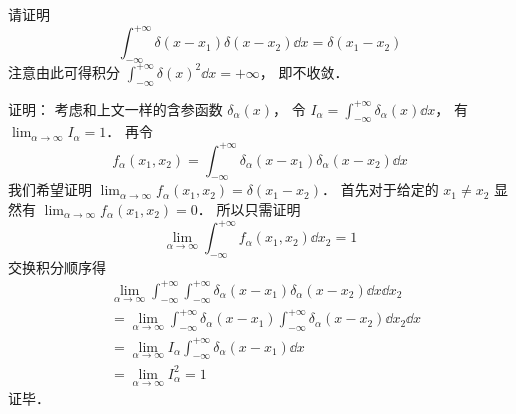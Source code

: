 \begin{example}{}
请证明
\begin{equation}
\int_{-\infty}^{+\infty} \delta(x-x_1) \delta(x-x_2) \dd{x} = \delta(x_1 - x_2)
\end{equation}
注意由此可得积分 $\int_{-\infty}^{+\infty}\delta(x)^2 \dd{x} = +\infty$， 即不收敛．

证明： 考虑和上文一样的含参函数 $\delta_\alpha(x)$， 令 $I_\alpha = \int_{-\infty}^{+\infty} \delta_\alpha(x) \dd{x}$， 有 $\lim_{\alpha\to\infty} I_\alpha = 1$． 再令
\begin{equation}
f_\alpha(x_1, x_2) = \int_{-\infty}^{+\infty} \delta_\alpha(x-x_1) \delta_\alpha(x-x_2) \dd{x}
\end{equation}
我们希望证明 $\lim_{\alpha\to\infty }f_\alpha(x_1, x_2) = \delta(x_1 - x_2)$． 首先对于给定的 $x_1 \ne x_2$ 显然有 $\lim_{\alpha\to\infty }f_\alpha(x_1, x_2) = 0$． 所以只需证明
\begin{equation}
\lim_{\alpha\to\infty }\int_{-\infty}^{+\infty} f_\alpha(x_1, x_2) \dd{x_2} = 1
\end{equation}
交换积分顺序得
\begin{equation}
\begin{aligned}
&\lim_{\alpha\to\infty }\int_{-\infty}^{+\infty}\int_{-\infty}^{+\infty} \delta_\alpha(x-x_1) \delta_\alpha(x-x_2) \dd{x}\dd{x_2}\\
&= \lim_{\alpha\to\infty }\int_{-\infty}^{+\infty} \delta_\alpha(x-x_1) \int_{-\infty}^{+\infty} \delta_\alpha(x-x_2)\dd{x_2} \dd{x}\\
&= \lim_{\alpha\to\infty } I_\alpha \int_{-\infty}^{+\infty} \delta_\alpha(x-x_1)\dd{x}\\
&= \lim_{\alpha\to\infty } I_\alpha^2 = 1
\end{aligned}
\end{equation}
证毕．
\end{example}

